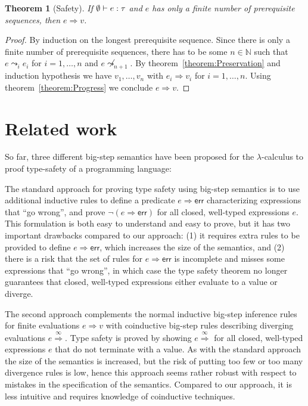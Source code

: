 \documentclass[12pt,a2paper,draft]{article}
\newcommand{\Tj}[3]{\mbox{\ensuremath{{#1}\vdash{#2}:{#3}}}}
\newcommand{\tj}[2]{\Tj{\emptyset}{#1}{#2}}
\newtheorem{theorem}{Theorem}
\begin{document}
\begin{theorem}[Safety]
  If $\tj{e}{\tau}$ and $e$ has only a finite number of prerequisite sequences, then $e \Rightarrow v$.
\end{theorem}

\begin{proof}
  By induction on the longest prerequisite sequence.
  Since there is only a finite number of prerequisite sequences, there has to be some $n \in \mathbb{N}$
  such that $e \leadsto_i e_i$ for $i = 1,\ldots,n$ and $e \not\leadsto_{n+1}$. By theorem~\ref{theorem:Preservation}
  and induction hypothesis we have $v_1,\ldots,v_n$ with $e_i \Rightarrow v_i$ for $i=1,\ldots,n$. Using
  theorem~\ref{theorem:Progress} we conclude $e \Rightarrow v$.
\end{proof}


\section{Related work}

So far, three different big-step semantics have been proposed for the $\lambda$-calculus to proof
type-safety of a programming language:

The standard approach \cite{Tofte87} for proving type safety using big-step semantics is to use
additional inductive rules to define a predicate $e \Rightarrow \textsf{err}$ characterizing expressions that
``go wrong'', and prove $\neg(e \Rightarrow \textsf{err})$ for all closed,
well-typed expressions $e$. This formulation is both easy to understand and easy to prove, but
it has two important drawbacks compared to our approach:
(1) it requires extra rules to be provided to define $e \Rightarrow \textsf{err}$,
which increases the size of the semantics, and (2) there is a risk that the set of rules for
$e \Rightarrow \textsf{err}$ is incomplete and misses some expressions that ``go wrong'',
in which case the type safety theorem no longer guarantees that closed, well-typed expressions
either evaluate to a value or diverge.

The second approach \cite{CousotCousot07,LeroyGrall09} complements the normal inductive big-step
inference rules for finite evaluations $e \Rightarrow v$ with coinductive big-step rules describing
diverging evaluations $e \stackrel{\infty}{\Rightarrow}$. Type safety is proved by showing
$e \stackrel{\infty}{\Rightarrow}$ for all closed, well-typed expressions $e$ that do not terminate
with a value. As with the standard approach the size of the semantics is increased, but the risk of
putting too few or too many divergence rules is low, hence this approach seems rather robust with
respect to mistakes in the specification of the semantics. Compared to our approach, it is less
intuitive and requires knowledge of coinductive techniques.
\end{document}
